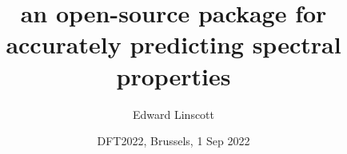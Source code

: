 \documentclass[xcolor=table,aspectratio=169]{beamer}
\title{\noindent\large{an open-source package for accurately predicting spectral properties}}
\author{Edward Linscott}
\institute{Theory and Simulation of Materials, EPFL}
\date{DFT2022, Brussels, 1 Sep 2022}
\numberwithin{equation}{section}
\begin{document}
\frame{\titlepage}

% 
% 
% 
% 
% 
% 

\end{document}
